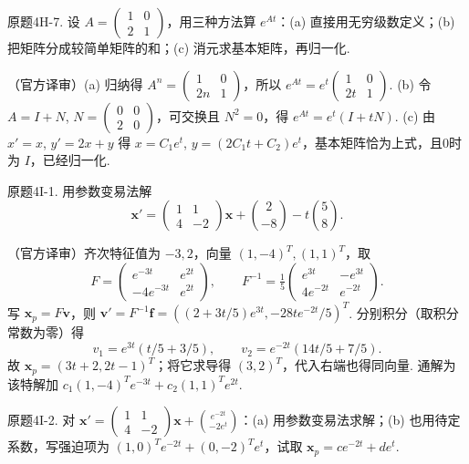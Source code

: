 \begin{exercise}\label{cw:bank-4H-7}原题4H-7. 设 $A=\begin{pmatrix}1&0\\2&1\end{pmatrix}$，用三种方法算 $e^{At}$：(a) 直接用无穷级数定义；(b) 把矩阵分成较简单矩阵的和；(c) 消元求基本矩阵，再归一化.\end{exercise}
\begin{solution}（官方译审）(a) 归纳得 $A^n=\begin{pmatrix}1&0\\2n&1\end{pmatrix}$，所以 $e^{At}=e^t\begin{pmatrix}1&0\\2t&1\end{pmatrix}$. (b) 令 $A=I+N$, $N=\begin{pmatrix}0&0\\2&0\end{pmatrix}$，可交换且 $N^2=0$，得 $e^{At}=e^t(I+tN)$. (c) 由 $x'=x$, $y'=2x+y$ 得 $x=C_1e^t$, $y=(2C_1t+C_2)e^t$，基本矩阵恰为上式，且0时为 $I$，已经归一化.\end{solution}
\begin{exercise}\label{cw:bank-4I-1}原题4I-1. 用参数变易法解
\[\mathbf x'=\begin{pmatrix}1&1\\4&-2\end{pmatrix}\mathbf x+\binom2{-8}-t\binom58.\]
\end{exercise}
\begin{solution}（官方译审）齐次特征值为 $-3,2$，向量 $(1,-4)^T,(1,1)^T$，取
\[F=\begin{pmatrix}e^{-3t}&e^{2t}\\-4e^{-3t}&e^{2t}\end{pmatrix},\qquad
F^{-1}=\tfrac15\begin{pmatrix}e^{3t}&-e^{3t}\\4e^{-2t}&e^{-2t}\end{pmatrix}.\]
写 $\mathbf x_p=F\mathbf v$，则 $\mathbf v'=F^{-1}\mathbf f=((2+3t/5)e^{3t},-28te^{-2t}/5)^T$. 分别积分（取积分常数为零）得
\[v_1=e^{3t}(t/5+3/5),\qquad v_2=e^{-2t}(14t/5+7/5).\]
故 $\mathbf x_p=(3t+2,2t-1)^T$；将它求导得 $(3,2)^T$，代入右端也得同向量. 通解为该特解加 $c_1(1,-4)^Te^{-3t}+c_2(1,1)^Te^{2t}$.\end{solution}
\begin{exercise}\label{cw:bank-4I-2}原题4I-2. 对 $\mathbf x'=\begin{pmatrix}1&1\\4&-2\end{pmatrix}\mathbf x+\binom{e^{-2t}}{-2e^t}$：(a) 用参数变易法求解；(b) 也用待定系数，写强迫项为 $(1,0)^Te^{-2t}+(0,-2)^Te^t$，试取 $\mathbf x_p=ce^{-2t}+de^t$.\end{exercise}
